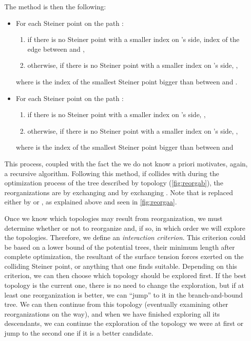 \documentclass{article}
\theoremstyle{plain}
\begin{document}
The method is then the following: 
\begin{itemize}
	\item For each Steiner point  on the path :
		\begin{enumerate}
			\item if there is no Steiner point with a smaller index on 's side,  index of the edge between  and ,
			\item otherwise, if there is no Steiner point with a smaller index on 's side, ,
		\end{enumerate}
		where  is the index of the smallest Steiner point bigger than  between  and .

	\item For each Steiner point  on the path :
		\begin{enumerate}
			\item if there is no Steiner point with a smaller index on 's side, ,
			\item otherwise, if there is no Steiner point with a smaller index on 's side, ,
		\end{enumerate}
		where  is the index of the smallest Steiner point bigger than  between  and 
\end{itemize}
This process, coupled with the fact the we do not know  a priori motivates, again, a recursive algorithm.
Following this method, if  collides with  during the optimization process of the tree described by topology  (\cref{fig:reorgab}), the reorganizations are  by exchanging  and  by exchanging . 
Note that  is replaced either by  or , as explained above and seen in \cref{fig:reorgaa}. 






Once we know which topologies may result from reorganization, we must determine whether or not to reorganize and, if so, in which order we will explore the topologies. 
Therefore, we define an \emph{interaction criterion}. 
This criterion could be based on a lower bound of the potential trees, their minimum length after complete optimization, the resultant of the surface tension forces exerted on the colliding Steiner point, or anything that one finds suitable. Depending on this criterion, we can then choose which topology should be explored first. 
If the best topology is the current one, there is no need to change the exploration, but if at least one reorganization is better, we can ``jump'' to it in the \mbox{branch-and-bound} tree. 
We can then continue from this topology (eventually examining other reorganizations on the way), and when we have finished exploring all its descendants, we can continue the exploration of the topology we were at first or jump to the second one if it is a better candidate. 
\end{document}
